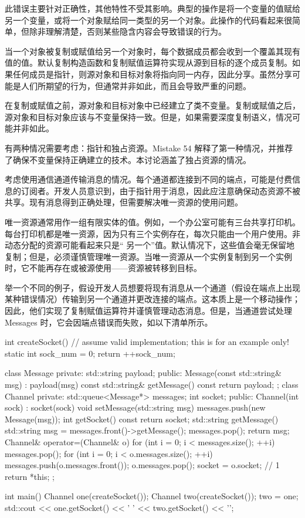 此错误主要针对正确性，其他特性不受其影响。典型的操作是将一个变量的值赋给另一个变量，或将一个对象赋给同一类型的另一个对象。此操作的代码看起来很简单，但除非理解清楚，否则某些隐含内容会导致错误的行为。

当一个对象被复制或赋值给另一个对象时，每个数据成员都会收到一个覆盖其现有值的值。默认复制构造函数和复制赋值运算符实现从源到目标的逐个成员复制。如果任何成员是指针，则源对象和目标对象将指向同一内存，因此分享。虽然分享可能是人们所期望的行为，但通常并非如此，而且会导致严重的问题。


在复制或赋值之前，源对象和目标对象中已经建立了类不变量。复制或赋值之后，源对象和目标对象应该与不变量保持一致。但是，如果需要深度复制语义，情况可能并非如此。

有两种情况需要考虑：指针和独占资源。Mistake 54 解释了第一种情况，并推荐了确保不变量保持正确建立的技术。本讨论涵盖了独占资源的情况。

考虑使用通信通道传输消息的情况。每个通道都连接到不同的端点，可能是付费信息的订阅者。开发人员意识到，由于指针用于消息，因此应注意确保动态资源不被共享。现有消息得到正确处理，但需要解决唯一资源的使用问题。

唯一资源通常用作一组有限实体的值。例如，一个办公室可能有三台共享打印机。每台打印机都是唯一资源，因为只有三个实例存在，每次只能由一个用户使用。非动态分配的资源可能看起来只是“ 另一个”值。默认情况下，这些值会毫无保留地复制；但是，必须谨慎管理唯一资源。当唯一资源从一个实例复制到另一个实例时，它不能再存在或被源使用——资源被转移到目标。

举一个不同的例子，假设开发人员想要将现有消息从一个通道（假设在端点上出现某种错误情况）传输到另一个通道并更改连接的端点。这本质上是一个移动操作；因此，他们实现了复制赋值运算符并谨慎管理动态消息。但是，当通道尝试处理 Messages 时，它会因端点错误而失败，如以下清单所示。


\begin{cpp}
int createSocket() {
  // assume valid implementation; this is for an example only!
  static int sock_num = 0;
  return ++sock_num;
}

class Message {
  private:
  std::string payload;
  public:
  Message(const std::string& msg) : payload(msg) {}
  const std::string& getMessage() const { return payload; }
};
class Channel {
private:
  std::queue<Message*> messages;
  int socket;
public:
  Channel(int sock) : socket(sock) {}
  void setMessage(std::string msg) { messages.push(new Message(msg)); }
  int getSocket() const { return socket; }
  std::string getMessage() {
    std::string msg = messages.front()->getMessage();
    messages.pop();
    return msg;
  }
  Channel& operator=(Channel& o) {
    for (int i = 0; i < messages.size(); ++i)
      messages.pop();
    for (int i = 0; i < o.messages.size(); ++i) {
      messages.push(o.messages.front());
      o.messages.pop();
    }
    socket = o.socket; // 1
    return *this;
  }
};

int main() {
  Channel one(createSocket());
  Channel two(createSocket());
  two = one;
  std::cout << one.getSocket() << ' ' << two.getSocket() << '\n';
}
\end{cpp}

